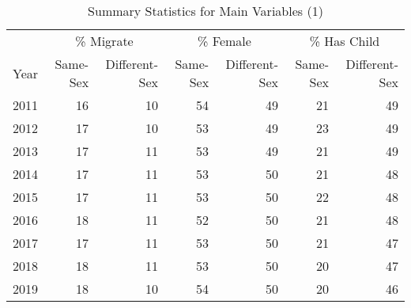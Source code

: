 \begin{table}[htbp]
\centering
\caption{Summary Statistics for Main Variables (1)}
\label{var_table_1} %
\begin{tabular}[t]{rrrrrrr}
\toprule
\multicolumn{1}{c}{ } & \multicolumn{2}{c}{\% Migrate} & \multicolumn{2}{c}{\% Female} & \multicolumn{2}{c}{\% Has Child} \\
\cmidrule(l{3pt}r{3pt}){2-3} \cmidrule(l{3pt}r{3pt}){4-5} \cmidrule(l{3pt}r{3pt}){6-7}
Year & Same-Sex & Different-Sex & Same-Sex & Different-Sex & Same-Sex & Different-Sex\\
\midrule
2011 & 16 & 10 & 54 & 49 & 21 & 49\\
2012 & 17 & 10 & 53 & 49 & 23 & 49\\
2013 & 17 & 11 & 53 & 49 & 21 & 49\\
2014 & 17 & 11 & 53 & 50 & 21 & 48\\
2015 & 17 & 11 & 53 & 50 & 22 & 48\\
2016 & 18 & 11 & 52 & 50 & 21 & 48\\
2017 & 17 & 11 & 53 & 50 & 21 & 47\\
2018 & 18 & 11 & 53 & 50 & 20 & 47\\
2019 & 18 & 10 & 54 & 50 & 20 & 46\\
\bottomrule
\end{tabular}
\end{table}

